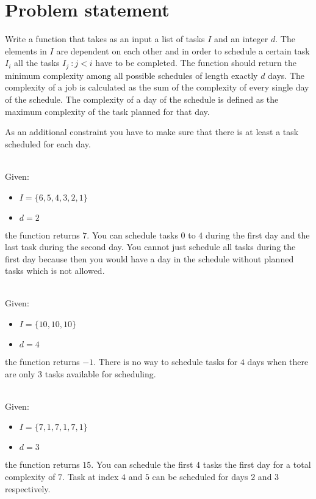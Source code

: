 \section{Problem statement}
\begin{exercise}
	Write a function that takes as an input a list of tasks $I$ and an integer $d$. The elements in
	$I$ are dependent on each other and in order to schedule a certain task $I_i$ all the tasks $I_j
	\: : j < i$ have to be completed. The function should return the minimum complexity among all
	possible schedules of length exactly $d$ days. The complexity of a job is calculated as the sum
	of the complexity of every single day of the schedule. The complexity of a day of the schedule is
	defined as the maximum complexity of the task planned for that day.

	As an additional constraint you have to make sure that there is at least a task scheduled for
	each day.
		
	\begin{example}
		\hfill \\
		Given:
		\begin{itemize}
			\item $I = \{6,5,4,3,2,1\}$
			\item $d = 2$
		\end{itemize}
		the function returns $7$. You can schedule tasks $0$ to $4$ during the first day and the
		last task during the second day. You cannot just schedule all tasks during the first day
		because then you would have a day in the schedule without planned tasks which is not
		allowed.
	\end{example}
	
	\begin{example}
		\hfill \\
		Given:
		\begin{itemize}
			\item $I = \{10,10,10\}$
			\item $d = 4$
		\end{itemize}
		the function returns $-1$. There is no way to schedule tasks for $4$ days when there are
		only $3$ tasks available for scheduling.
	\end{example}

		
	\begin{example}
		\hfill \\
		Given:
		\begin{itemize}
			\item $I = \{7,1,7,1,7,1\}$
			\item $d = 3$
		\end{itemize}
		the function returns $15$. You can schedule the first $4$ tasks the first day for a total
		complexity of $7$. Task at index $4$ and $5$ can be scheduled for days $2$ and $3$
		respectively. 


\end{example}
\end{exercise}
